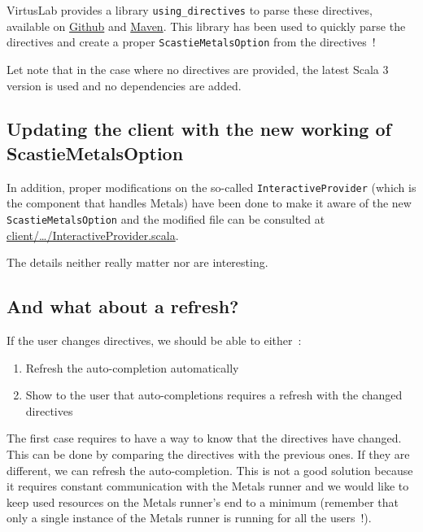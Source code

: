 \documentclass{article}
\begin{document}
VirtusLab provides a library \lstinline{using_directives} to parse these directives, available on \href{https://github.com/VirtusLab/using_directives}{Github} and \href{https://mvnrepository.com/artifact/org.virtuslab.scala-cli/directives_3}{Maven}. This library has been used to quickly parse the directives and create a proper \lstinline{ScastieMetalsOption} from the directives~!

Let note that in the case where no directives are provided, the latest Scala 3 version is used and no dependencies are added.

\subsection{Updating the client with the new working of ScastieMetalsOption}

In addition, proper modifications on the so-called \lstinline{InteractiveProvider} (which is the component that handles Metals) have been done to make it aware of the new \lstinline{ScastieMetalsOption} and the modified file can be consulted at \href{https://github.com/Maeeen/scastie/blob/main/client/src/main/scala/com.olegych.scastie.client/components/editor/InteractiveProvider.scala#LL46C26-L46C26}{client/\ldots/InteractiveProvider.scala}.

The details neither really matter nor are interesting.

\subsection{And what about a refresh?}

If the user changes directives, we should be able to either~:

\begin{enumerate}
    \item Refresh the auto-completion automatically
    \item Show to the user that auto-completions requires a refresh with the changed directives
\end{enumerate}

The first case requires to have a way to know that the directives have changed. This can be done by comparing the directives with the previous ones. If they are different, we can refresh the auto-completion. This is not a good solution because it requires constant communication with the Metals runner and we would like to keep used resources on the Metals runner's end to a minimum (remember that only a single instance of the Metals runner is running for all the users~!).
\end{document}
